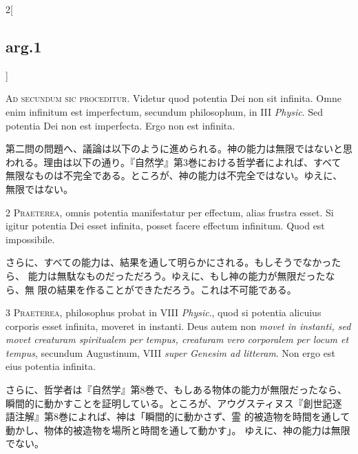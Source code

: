 \documentclass[paper=a4paper,fontsize=10pt,jafontsize=9pt,titlepage]{jlreq}
\begin{document}
\begin{paracol}{2}[\subsection{arg.1}]

{\Huge A}{\scshape d secundum sic proceditur}. Videtur quod potentia Dei
 non sit infinita. Omne enim infinitum est imperfectum, secundum
 philosophum, in III {\itshape Physic}. Sed potentia Dei non est imperfecta. Ergo
 non est infinita.

\switchcolumn

第二問の問題へ、議論は以下のように進められる。神の能力は無限ではないと思
 われる。理由は以下の通り。『自然学』第3巻における哲学者によれば、すべて
 無限なものは不完全である。ところが、神の能力は不完全ではない。ゆえに、
 無限ではない。


{\scshape 2 Praeterea}, omnis potentia manifestatur per effectum, alias
 frustra esset. Si igitur potentia Dei esset infinita, posset facere
 effectum infinitum. Quod est impossibile.

\switchcolumn

さらに、すべての能力は、結果を通して明らかにされる。もしそうでなかったら、
 能力は無駄なものだっただろう。ゆえに、もし神の能力が無限だったなら、無
 限の結果を作ることができただろう。これは不可能である。


{\scshape 3 Praeterea}, philosophus probat in VIII {\itshape Physic}.,
 quod si potentia alicuius corporis esset infinita, moveret in
 instanti. Deus autem non {\itshape movet in instanti, sed movet creaturam
 spiritualem per tempus, creaturam vero corporalem per locum et tempus},
 secundum Augustinum, VIII {\itshape super Genesim ad litteram}. Non ergo est eius
 potentia infinita.

\switchcolumn

さらに、哲学者は『自然学』第8巻で、もしある物体の能力が無限だったなら、
 瞬間的に動かすことを証明している。ところが、アウグスティヌス『創世記逐
 語注解』第8巻によれば、神は「瞬間的に動かさず、霊
 的被造物を時間を通して動かし、物体的被造物を場所と時間を通して動かす」。
 ゆえに、神の能力は無限でない。


\end{paracol}
\end{document}
